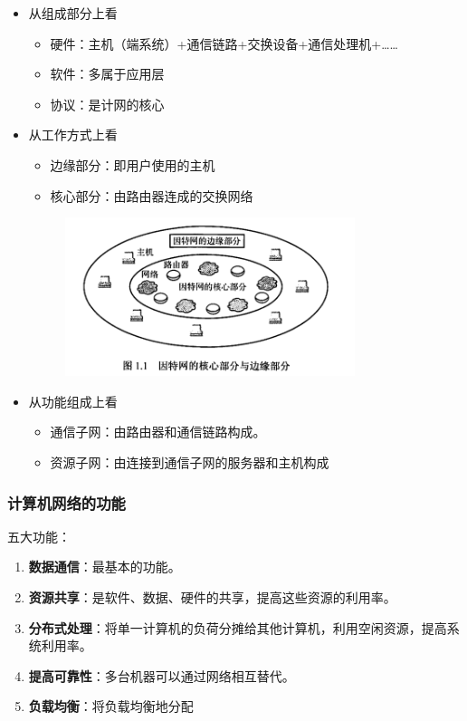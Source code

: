 \documentclass[12pt, a4paper, oneside]{ctexart}
\begin{document}
\begin{itemize}
    \item 从组成部分上看
    \begin{itemize}
        \item 硬件：主机（端系统）+通信链路+交换设备+通信处理机+……
        \item 软件：多属于应用层
        \item 协议：是计网的核心
    \end{itemize}
    \item 从工作方式上看
    \begin{itemize}
        \item 边缘部分：即用户使用的主机
        \item 核心部分：由路由器连成的交换网络
    \end{itemize}
    \begin{figure}
        \centering
        \includegraphics[width=0.8\textwidth]{./images/network_core_and_edge.png}
    \end{figure}
    \item 从功能组成上看
    \begin{itemize}
        \item 通信子网：由路由器和通信链路构成。
        \item 资源子网：由连接到通信子网的服务器和主机构成
    \end{itemize}
\end{itemize}

\subsubsection{计算机网络的功能}

五大功能：
\begin{enumerate}
    \item {\bf 数据通信}：最基本的功能。
    \item {\bf 资源共享}：是软件、数据、硬件的共享，提高这些资源的利用率。
    \item {\bf 分布式处理}：将单一计算机的负荷分摊给其他计算机，利用空闲资源，提高系统利用率。
    \item {\bf 提高可靠性}：多台机器可以通过网络相互替代。
    \item {\bf 负载均衡}：将负载均衡地分配
\end{enumerate}
\end{document}
